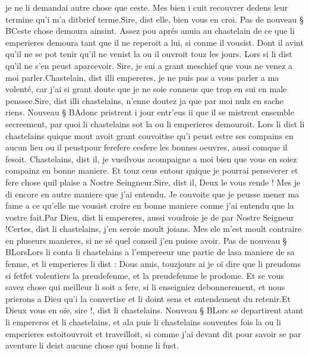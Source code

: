 \documentclass{article}
\begin{document}
\begin{pages}
      je ne li demandai autre chose que ceste. Mes bien i cuit recouvrer dedens 
      leur termine qu’i m’a ditbrief terme.Sire, dist elle, bien vous en croi. \pend
\pstart Pas de nouveau § BCeste chose demoura ainsint. 
   Assez pou aprés anuia au chastelain 
      de ce que li emperieres demoura tant que il ne reperoit a lui, si conme il vousist. 
      Dont il avint qu’il ne se pot tenir qu’il ne venist la ou il ouvroit touz les jours. Lors si li dist qu’il ne s’en peust aparcevoir. 
      Sire, je sui a grant meschief que vous ne venez a moi parler.Chastelain, dist illi empereres, 
      je ne puis pas a vous parler a ma volenté, car j’ai si grant doute que je ne soie conneus que trop en sui en male penssee.Sire, dist illi chastelains, 
      n’enne doutez ja que par moi nulz en sache riens.
   Nouveau § BAdonc pristrent i jour entr’eus ii que il se mistrent ensemble secreement, 
      par quoi li chastelains sot la ou li emperieres demouroit. 
   Lors li dist li chastelains quique 
   mout avoit grant couvoitise qu’i peust estre ses compains en aucun lieu 
   ou il peustpour 
   ferefere cesfere les bonnes oeuvres, 
   aussi comque il fesoit.
   Chastelains, dist il, je 
      vueilvous acompaigne a moi bien que vous en soiez compainz en bonne maniere. 
      Et touz ceus entour quique je pourrai perseverer et fere chose quil plaise 
      a Nostre Seingneur.Sire, dist il, Deux le vous rende ! Mes je di encore en autre maniere que j’ai entendu. 
      Je couvoite que je peusse mener ma fame a ce qu’elle me vousist croire 
      en bonne maniere conme j’ai entendu que la vostre fait.Par Dieu, dist li empereres, aussi voudroie je de par 
         Nostre Seigneur !Certes, dist li chastelains, j’en seroie moult joians. 
      Mes ele m’est moult contraire en pluseurs manieres, si ne sé quel conseil j’en puisse avoir. \pend
\pstart Pas de nouveau § BLorsLors li 
   conta li chastelains 
   a l’empereeur 
   une partie de lasa maniere 
   de sa fenme,
   et li emperieres li dist :
   Dous amis, touzjours ai je oï dire que li preudoms si 
      fetfet volentiers la preudefenme, 
      et la preudefenme le prodome. Et se vous savez chose qui meilleur li soit a fere, 
      si li enseigniez debonnerement, et nous prierons a Dieu qu’i la convertise et li doint sens et entendement du retenir.Et Dieux vous en oïe, sire !, dist li chastelains.
   Nouveau § BLors se departirent atant li empereres et 
   li chastelains, et ala puis li chastelains souventes fois la ou 
   li emperieres estoitouvroit et traveilloit, 
      si comme j'ai devant dit pour savoir se par aventure li deist aucune chose qui bonne li fust. 

\end{pages}
\end{document}
